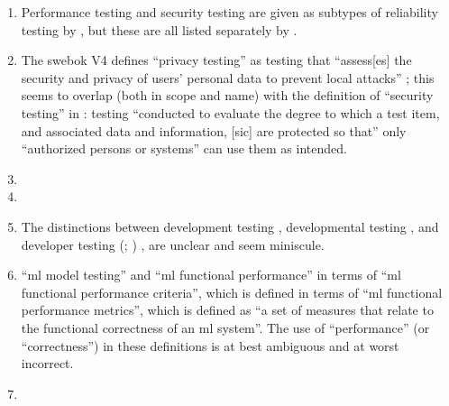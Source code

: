 \begin{enumerate}
    \item %
          Performance testing and security testing are given as subtypes of
          reliability testing by \citep{ISO_IEC2023a}, but these are all listed
          separately by \citep[p.~53]{Firesmith2015}.
    \item %
          The \acs{swebok} V4 defines ``privacy testing'' as testing that
          ``assess[es] the security and privacy of users' personal data to
          prevent local attacks'' \citep[p.~5-10]{SWEBOK2024}; this seems to
          overlap (both in scope and name) with the definition of ``security
          testing'' in \citep[p.~7]{IEEE2022}: testing
          ``conducted to evaluate the degree to which a test item, and
          associated data and information, [sic] are protected so that'' only
          ``authorized persons or systems'' can use them as intended.
    \item %
          \tourDiscrep{}
    \item %
          \alphaDiscrep{}
    \item %
          The distinctions between development testing \citep[p.~136]{IEEE2017},
          developmental testing \citep[p.~30]{Firesmith2015}, and developer
          testing
          \ifnotpaper
              (\citealp[p.~39]{Firesmith2015}; \citealp[p.~11]{Gerrard2000a})
          \else
              \cite[p.~39]{Firesmith2015}, \cite[p.~11]{Gerrard2000a}
          \fi are unclear and seem miniscule.
    \item %
           \citetISTQB{} 
          ``\acf{ml} model testing'' and ``\acs{ml} functional performance''
          in terms of ``\acs{ml} functional performance criteria'',
          which is defined in terms of ``\acs{ml} functional performance
          metrics'', which is defined as ``a set of measures that relate to the
          functional correctness of an \acs{ml} system''. The use
          of ``performance'' (or ``correctness'') in these definitions is at
          best ambiguous and at worst incorrect.
    \item %

\end{enumerate}
